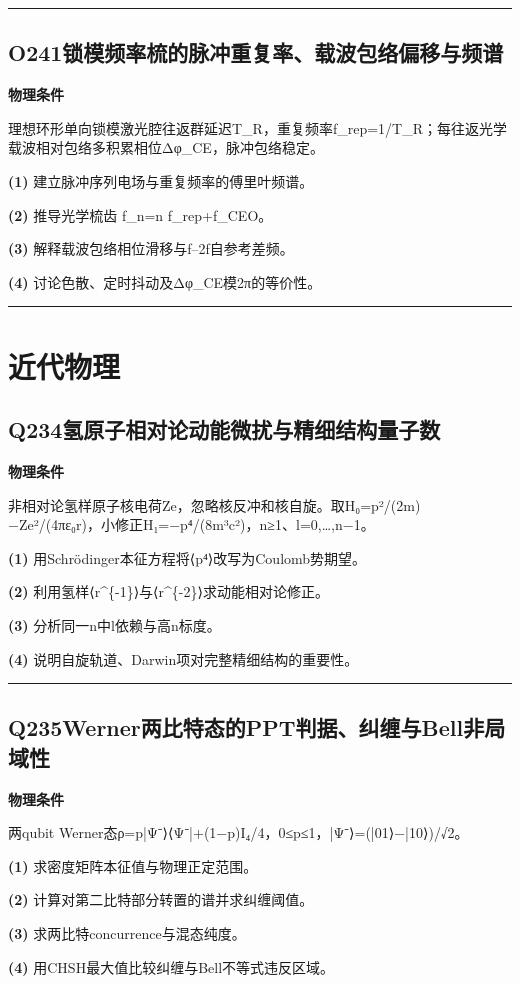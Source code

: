 \documentclass[UTF8,a4paper,11pt,oneside,openany]{ctexbook}
\begin{document}
\par\bigskip\hrule\bigskip
\section*{O241\quad 锁模频率梳的脉冲重复率、载波包络偏移与频谱}
\textbf{物理条件}\par 理想环形单向锁模激光腔往返群延迟T\_R，重复频率f\_rep=1/T\_R；每往返光学载波相对包络多积累相位Δφ\_CE，脉冲包络稳定。
\par\noindent\textbf{(1)} 建立脉冲序列电场与重复频率的傅里叶频谱。
\par\noindent\textbf{(2)} 推导光学梳齿 f\_n=n f\_rep+f\_CEO。
\par\noindent\textbf{(3)} 解释载波包络相位滑移与f–2f自参考差频。
\par\noindent\textbf{(4)} 讨论色散、定时抖动及Δφ\_CE模2π的等价性。

\par\bigskip\hrule\bigskip
\chapter{近代物理}
\section*{Q234\quad 氢原子相对论动能微扰与精细结构量子数}
\textbf{物理条件}\par 非相对论氢样原子核电荷Ze，忽略核反冲和核自旋。取H₀=p²/(2m)−Ze²/(4πε₀r)，小修正H₁=−p⁴/(8m³c²)，n≥1、l=0,…,n−1。
\par\noindent\textbf{(1)} 用Schrödinger本征方程将⟨p⁴⟩改写为Coulomb势期望。
\par\noindent\textbf{(2)} 利用氢样⟨r\textasciicircum{}\{-1\}⟩与⟨r\textasciicircum{}\{-2\}⟩求动能相对论修正。
\par\noindent\textbf{(3)} 分析同一n中l依赖与高n标度。
\par\noindent\textbf{(4)} 说明自旋轨道、Darwin项对完整精细结构的重要性。

\par\bigskip\hrule\bigskip
\section*{Q235\quad Werner两比特态的PPT判据、纠缠与Bell非局域性}
\textbf{物理条件}\par 两qubit Werner态ρ=p|Ψ⁻⟩⟨Ψ⁻|+(1−p)I₄/4，0≤p≤1，|Ψ⁻⟩=(|01⟩−|10⟩)/√2。
\par\noindent\textbf{(1)} 求密度矩阵本征值与物理正定范围。
\par\noindent\textbf{(2)} 计算对第二比特部分转置的谱并求纠缠阈值。
\par\noindent\textbf{(3)} 求两比特concurrence与混态纯度。
\par\noindent\textbf{(4)} 用CHSH最大值比较纠缠与Bell不等式违反区域。
\end{document}
